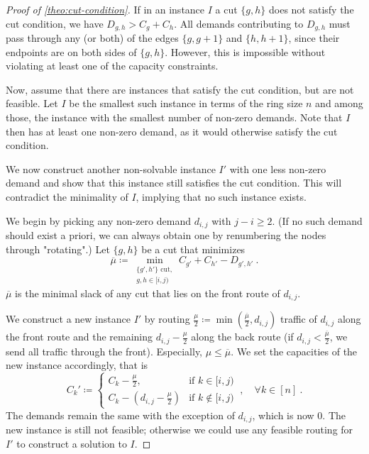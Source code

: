 \begin{proof}[Proof of \cref{theo:cut-condition}]
	If in an instance $I$ a cut $\{g, h\}$ does not satisfy the cut condition, we have $D_{g, h} > C_g + C_h$.
	All demands contributing to $D_{g, h}$ must pass through any (or both) of the edges $\{g, g+1\}$ and $\{h, h+1\}$, since their endpoints are on both sides of $\{g, h\}$.
	However, this is impossible without violating at least one of the capacity constraints.
	
	Now, assume that there are instances that satisfy the cut condition, but are not feasible.
	Let $I$ be the smallest such instance in terms of the ring size $n$ and among those, the instance with the smallest number of non-zero demands.
	Note that $I$ then has at least one non-zero demand, as it would otherwise satisfy the cut condition.
	
	We now construct another non-solvable instance $I'$ with one less non-zero demand and show that this instance still satisfies the cut condition.
	This will contradict the minimality of $I$, implying that no such instance exists.
	
 	We begin by picking any non-zero demand $d_{i,j}$ with $j - i \geq 2$.
 	(If no such demand should exist a priori, we can always obtain one by renumbering the nodes through "rotating".)
 	Let $\{g, h\}$ be a cut that minimizes
 	\begin{equation}
 		\overline{\mu} \coloneqq \min_{\substack{ \{g', h'\} \text{ cut},\\ g, h \in [i, j)}}
 		C_{g'} + C_{h'} - D_{g', h'} \ .
 	\end{equation}
 	$\overline{\mu}$ is the minimal slack of any cut that lies on the front route of $d_{i, j}$.
	
	We construct a new instance $I'$ by routing $\frac{\mu}{2} \coloneqq \min(\frac{\overline{\mu}}{2}, d_{i, j})$ traffic of $d_{i,j}$ along the front route and the remaining $d_{i,j} - \frac{\mu}{2}$ along the back route (if $d_{i,j} < \frac{\overline{\mu}}{2}$, we send all traffic through the front).
	Especially, $\mu \leq \overline{\mu}$.
	We set the capacities of the new instance accordingly, that is
	\begin{equation}
		C_k' \coloneqq 
		\begin{cases}
			C_k - \frac{\mu}{2}, & \text{if } k \in [i, j)\\
			C_k - (d_{i,j} - \frac{\mu}{2}) & \text{if } k \notin [i, j)
		\end{cases} \ , \quad \forall k \in [n] \ .
	\end{equation}
	The demands remain the same with the exception of $d_{i,j}$, which is now $0$.
	The new instance is still not feasible; otherwise we could use any feasible routing for $I'$ to construct a solution to $I$.
	

\end{proof}
